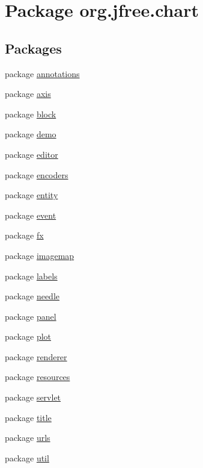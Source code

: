 \hypertarget{namespaceorg_1_1jfree_1_1chart}{}\section{Package org.\+jfree.\+chart}
\label{namespaceorg_1_1jfree_1_1chart}
\subsection*{Packages}
\begin{DoxyCompactItemize}
\item 
package \mbox{\hyperlink{namespaceorg_1_1jfree_1_1chart_1_1annotations}{annotations}}
\item 
package \mbox{\hyperlink{namespaceorg_1_1jfree_1_1chart_1_1axis}{axis}}
\item 
package \mbox{\hyperlink{namespaceorg_1_1jfree_1_1chart_1_1block}{block}}
\item 
package \mbox{\hyperlink{namespaceorg_1_1jfree_1_1chart_1_1demo}{demo}}
\item 
package \mbox{\hyperlink{namespaceorg_1_1jfree_1_1chart_1_1editor}{editor}}
\item 
package \mbox{\hyperlink{namespaceorg_1_1jfree_1_1chart_1_1encoders}{encoders}}
\item 
package \mbox{\hyperlink{namespaceorg_1_1jfree_1_1chart_1_1entity}{entity}}
\item 
package \mbox{\hyperlink{namespaceorg_1_1jfree_1_1chart_1_1event}{event}}
\item 
package \mbox{\hyperlink{namespaceorg_1_1jfree_1_1chart_1_1fx}{fx}}
\item 
package \mbox{\hyperlink{namespaceorg_1_1jfree_1_1chart_1_1imagemap}{imagemap}}
\item 
package \mbox{\hyperlink{namespaceorg_1_1jfree_1_1chart_1_1labels}{labels}}
\item 
package \mbox{\hyperlink{namespaceorg_1_1jfree_1_1chart_1_1needle}{needle}}
\item 
package \mbox{\hyperlink{namespaceorg_1_1jfree_1_1chart_1_1panel}{panel}}
\item 
package \mbox{\hyperlink{namespaceorg_1_1jfree_1_1chart_1_1plot}{plot}}
\item 
package \mbox{\hyperlink{namespaceorg_1_1jfree_1_1chart_1_1renderer}{renderer}}
\item 
package \mbox{\hyperlink{namespaceorg_1_1jfree_1_1chart_1_1resources}{resources}}
\item 
package \mbox{\hyperlink{namespaceorg_1_1jfree_1_1chart_1_1servlet}{servlet}}
\item 
package \mbox{\hyperlink{namespaceorg_1_1jfree_1_1chart_1_1title}{title}}
\item 
package \mbox{\hyperlink{namespaceorg_1_1jfree_1_1chart_1_1urls}{urls}}
\item 
package \mbox{\hyperlink{namespaceorg_1_1jfree_1_1chart_1_1util}{util}}
\end{DoxyCompactItemize}
